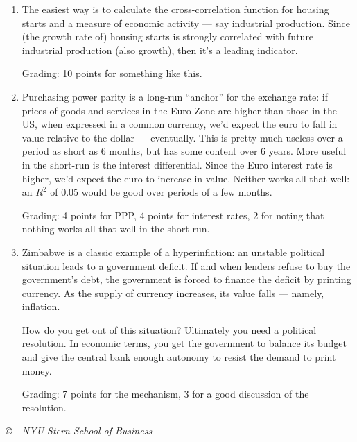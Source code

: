 \documentclass[letterpaper,12pt]{article}
\begin{document}
\begin{enumerate}
\begin{enumerate}
\item The easiest way is to calculate the cross-correlation function
for housing starts and a measure of economic activity --- say
industrial production.
Since (the growth rate of) housing starts is strongly    
correlated with future industrial production (also growth), 
then it's  a leading indicator.  

Grading:  10 points for something like this.  

\item  Purchasing power parity is a long-run ``anchor'' for the 
exchange rate:  if prices of goods and services in the Euro Zone
are higher than those in the US, when expressed in a common currency, 
we'd expect the euro to fall in value relative to the dollar 
--- eventually.
This is pretty much useless over a period as short as 6 months,
but has some content over 6 years.
More useful in the short-run is the interest differential.
Since the Euro interest rate is higher, we'd expect the euro to increase in value.
Neither works all that well:  an $R^2$ of 0.05 would be good over
periods of a few months.  

Grading:  4 points for PPP, 4 points for interest rates, 
2 for noting that nothing works all that well in the short run.  

\item Zimbabwe is a classic example of a hyperinflation:
an unstable political situation leads to 
a government deficit.
If and when lenders refuse to buy the government's debt, 
the government is forced to finance the deficit by
printing currency.
As the supply of currency increases, its value falls 
--- namely, inflation.

How do you get out of this situation?
Ultimately you need a political resolution.
In economic terms, you get the government to balance
its budget and give the central bank enough autonomy 
to resist the demand to print money. 

Grading:  7 points for the mechanism, 
3 for a good discussion of the resolution.   

\end{enumerate}


\end{enumerate}


\vfill \centerline{\it \copyright \ \number\year \ 
NYU Stern School of Business}
\end{document}
